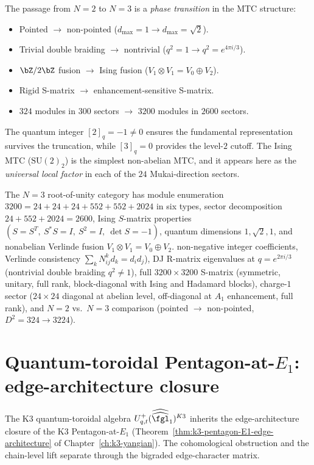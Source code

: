 \begin{remark}[The \texorpdfstring{$N = 2 \to N = 3$}{N = 2 -> N = 3} phase transition]
\label{rem:n2-n3-phase-transition}
The passage from $N = 2$ to $N = 3$ is a \emph{phase transition}
in the MTC structure:
\begin{itemize}
\item Pointed $\to$ non-pointed
 ($d_{\max} = 1 \to d_{\max} = \sqrt{2}$).
\item Trivial double braiding $\to$ nontrivial
 ($q^2 = 1 \to q^2 = e^{4\pi i/3}$).
\item $\bZ/2\bZ$ fusion $\to$ Ising fusion
 ($V_1 \otimes V_1 = V_0 \oplus V_2$).
\item Rigid S-matrix $\to$ enhancement-sensitive S-matrix.
\item $324$ modules in $300$ sectors $\to$
 $3200$ modules in $2600$ sectors.
\end{itemize}
The quantum integer $[2]_q = -1 \neq 0$ ensures the fundamental
representation survives the truncation, while $[3]_q = 0$
provides the level-$2$ cutoff. The Ising MTC
($\mathrm{SU}(2)_2$) is the simplest non-abelian MTC,
and it appears here as the \emph{universal local factor} in
each of the $24$ Mukai-direction sectors.
\end{remark}
The \(N=3\) root-of-unity category has module enumeration
\(3200=24+24+24+552+552+2024\) in six types, sector decomposition
\(24+552+2024=2600\), Ising \(S\)-matrix properties
\((S=S^T,\ S^\ast S=I,\ S^2=I,\ \det S=-1)\), quantum dimensions
\(1,\sqrt2,1\), and nonabelian Verlinde fusion
\(V_1\otimes V_1=V_0\oplus V_2\).
non-negative integer coefficients, Verlinde consistency
$\sum_k N^k_{ij} d_k = d_i d_j$),
DJ R-matrix eigenvalues at $q = e^{2\pi i/3}$
(nontrivial double braiding $q^2 \neq 1$),
full $3200 \times 3200$ S-matrix (symmetric, unitary, full rank,
block-diagonal with Ising and Hadamard blocks),
charge-$1$ sector ($24 \times 24$ diagonal at abelian level,
off-diagonal at $A_1$ enhancement, full rank),
and $N = 2$ vs.\ $N = 3$ comparison
(pointed $\to$ non-pointed, $D^2 = 324 \to 3224$).


\section{Quantum-toroidal Pentagon-at-\texorpdfstring{$E_1$}{E-1}: edge-architecture closure}
\label{sec:k3qt-pentagon-edge-architecture}

The K$3$ quantum-toroidal algebra $U^+_{q, t}(\widehat{\widehat{\fgl}}_1)^{K3}$
inherits the edge-architecture closure of the K$3$ Pentagon-at-$E_1$
\textup{(}Theorem~\ref{thm:k3-pentagon-E1-edge-architecture} of
Chapter~\ref{ch:k3-yangian}\textup{).} The cohomological obstruction
and the chain-level lift separate through the bigraded edge-character
matrix.

